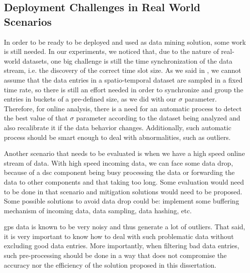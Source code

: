 \subsection{Deployment Challenges in Real World Scenarios}
In order to be ready to be deployed and used as data mining solution, some work is still needed. In our experiments, we
noticed that, due to the nature of real-world datasets, one big challenge is still the time synchronization of the data
stream, i.e. the discovery of the correct time slot size. As we said in , we cannot assume
that the data entries in a spatio-temporal dataset are sampled in a fixed time rate, so there is still an effort needed
in order to synchronize and group the entries in buckets of a pre-defined size, as we did with our $\sigma$ parameter.
Therefore, for online analysis, there is a need for an automatic process to detect the best value of that $\sigma$
parameter according to the dataset being analyzed and also recalibrate it if the data behavior changes. Additionally,
such automatic process should be smart enough to deal with abnormalities, such as outliers.

Another scenario that needs to be evaluated is when we have a high speed online stream of data. With high speed incoming
data, we can face some data drop, because of a \ac{dsc} component being busy processing the data or forwarding the data
to other components and that taking too long. Some evaluation would need to be done in that scenario and mitigation
solutions would need to be proposed. Some possible solutions to avoid data drop could be: implement some buffering
mechanism of incoming data, data sampling, data hashing, etc.

\ac{gps} data is known to be very noisy and thus generate a lot of outliers. That said, it is very important to know how
to deal with such problematic data without excluding good data entries. More importantly, when filtering bad data
entries, such pre-processing should be done in a way that does not compromise the accuracy nor the efficiency of the
solution proposed in this dissertation.

